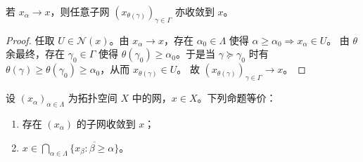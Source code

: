 \documentclass[lang=cn,a4paper,newtx,figureplace=section,tableplace=section]{elegantbook}
\begin{document}
 
 \begin{lemma}\label{lem:subnet-limit}
 若 $x_{\alpha}\to x$，则任意子网 $(x_{\theta(\gamma)})_{\gamma\in\Gamma}$ 亦收敛到 $x$。
 \end{lemma}
 \begin{proof}
 任取 $U\in\mathcal{N}(x)$。由 $x_{\alpha}\to x$，存在 $\alpha_0\in\Lambda$ 使得 $\alpha\ge \alpha_0\Rightarrow x_{\alpha}\in U$。
 由 $\theta$ 余最终，存在 $\gamma_0\in\Gamma$ 使得 $\theta(\gamma_0)\ge \alpha_0$。于是当 $\gamma\succeq\gamma_0$ 时有 $\theta(\gamma)\ge \theta(\gamma_0)\ge \alpha_0$，从而 $x_{\theta(\gamma)}\in U$。
 故 $(x_{\theta(\gamma)})_{\gamma\in\Gamma}\to x$。
 \end{proof}
 
 \begin{theorem}\label{thm:cluster-subnet}
 设 $(x_{\alpha})_{\alpha\in\Lambda}$ 为拓扑空间 $X$ 中的网，$x\in X$。下列命题等价：
 \begin{enumerate}
 \item 存在 $(x_{\alpha})$ 的子网收敛到 $x$；
 \item $x\in\displaystyle\bigcap_{\alpha\in\Lambda}\overline{\{x_{\beta}:\beta\ge\alpha\}}$。
 \end{enumerate}
 \end{theorem}
\end{document}
